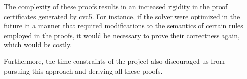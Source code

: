 The complexity of these proofs results in an increased rigidity in the proof certificates
generated by cvc5.
%
For instance, if the solver were optimized in the future in a manner that required 
modifications to the semantics of certain rules employed in the proofs, it would be
necessary to prove their correctness again, which would be costly.

Furthermore, the time constraints of the project also discouraged us from pursuing
this approach and deriving all these proofs.





